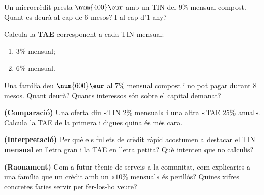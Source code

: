 \begin{exercicis}
\begin{exlist}
  \item Un microcrèdit presta $\num{400}\eur$ amb un TIN del $9\%$ mensual compost.
        Quant es deurà al cap de $6$ mesos? I al cap d'$1$ any?
  \item Calcula la \textbf{TAE} corresponent a cada TIN mensual:
    \begin{enumerate}[label=\alph*), leftmargin=1.6em, topsep=2pt]
      \item $3\%$ mensual;
      \item $6\%$ mensual.
    \end{enumerate}
  \item Una família deu $\num{600}\eur$ al $7\%$ mensual compost i no pot pagar durant
        $8$ mesos. Quant deurà? Quants interessos són sobre el capital demanat?
  \item \textbf{(Comparació)} Una oferta diu «TIN $2\%$ mensual» i una altra «TAE
        $25\%$ anual». Calcula la TAE de la primera i digues quina és més cara.
  \item \textbf{(Interpretació)} Per què els fullets de crèdit ràpid acostumen a
        destacar el TIN \textbf{mensual} en lletra gran i la TAE en lletra petita? Què
        intenten que no calculis?
  \item \textbf{(Raonament)} Com a futur tècnic de serveis a la comunitat, com
        explicaries a una família que un crèdit amb un «$10\%$ mensual» és perillós?
        Quines xifres concretes faries servir per fer-los-ho veure?
\end{exlist}
\end{exercicis}


